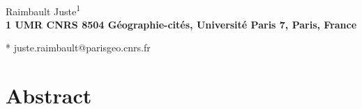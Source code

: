 \documentclass[10pt,letterpaper]{article}
\date{}
\begin{document}
\vspace*{0.35in}

\begin{flushleft}
{\Large
\textbf{}
}
\newline
\\
Raimbault Juste\textsuperscript{1}
\\
\bigskip
\bf{1} UMR CNRS 8504 G{\'e}ographie-cit{\'e}s, Universit{\'e} Paris 7, Paris, France
\\
\bigskip

% 
%





* juste.raimbault@parisgeo.cnrs.fr

\end{flushleft}
\section*{Abstract}
\end{document}
